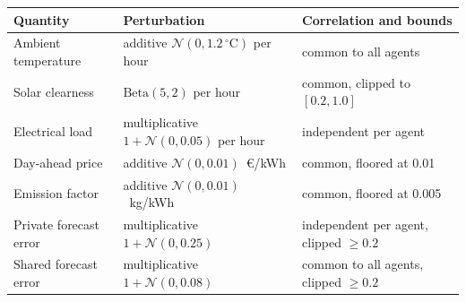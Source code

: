 \begin{tabularx}{\textwidth}{@{}>{\raggedright\arraybackslash}p{4.0cm}>{\raggedright\arraybackslash}p{3.7cm}X@{}}
\toprule
Quantity & Perturbation & Correlation and bounds \\
\midrule
Ambient temperature & additive $\mathcal N(0,1.2\,^\circ\mathrm{C})$ per hour & common to all agents \\
Solar clearness & $\mathrm{Beta}(5,2)$ per hour & common, clipped to $[0.2,1.0]$ \\
Electrical load & multiplicative $1+\mathcal N(0,0.05)$ per hour & independent per agent \\
Day-ahead price & additive $\mathcal N(0,0.01)$~\euro/kWh & common, floored at 0.01 \\
Emission factor & additive $\mathcal N(0,0.01)$~kg/kWh & common, floored at 0.005 \\
Private forecast error & multiplicative $1+\mathcal N(0,0.25)$ & independent per agent, clipped $\ge0.2$ \\
Shared forecast error & multiplicative $1+\mathcal N(0,0.08)$ & common to all agents, clipped $\ge0.2$ \\
\bottomrule
\end{tabularx}
